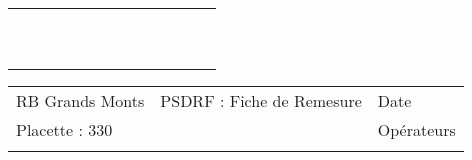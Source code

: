 \documentclass[a4paper, landscape]{article}\usepackage[]{graphicx}\usepackage[]{color}
\begin{document}
{\begin{tabular}{|p{1cm}|p{2cm}|p{1.6cm}|p{1.6cm}|p{1.6cm}|p{1.6cm}|p{1.5cm}|p{1.5cm}|p{1.5cm}|p{1.5cm}|p{1.5cm}|p{7.5cm}|p{5cm}|}
   \rowcolor[gray]{0.95} \hline
 &  &  &  &  &  &  &  &  &  &  &  &  \\ 
   \hline
 &  &  &  &  &  &  &  &  &  &  &  &  \\ 
   \rowcolor[gray]{0.95} \hline
 &  &  &  &  &  &  &  &  &  &  &  &  \\ 
   \hline
 &  &  &  &  &  &  &  &  &  &  &  &  \\ 
   \rowcolor[gray]{0.95} \hline
 &  &  &  &  &  &  &  &  &  &  &  &  \\ 
   \hline
 &  &  &  &  &  &  &  &  &  &  &  &  \\ 
   \rowcolor[gray]{0.95} \hline
 &  &  &  &  &  &  &  &  &  &  &  &  \\ 
   \hline
 &  &  &  &  &  &  &  &  &  &  &  &  \\ 
   \rowcolor[gray]{0.95} \hline
 &  &  &  &  &  &  &  &  &  &  &  &  \\ 
   \hline
 &  &  &  &  &  &  &  &  &  &  &  &  \\ 
   \rowcolor[gray]{0.95} \hline
 &  &  &  &  &  &  &  &  &  &  &  &  \\ 
   \hline
\end{tabular}
}

\begin{tabular}{p{10cm}p{10cm}p{8cm}}
  RB Grands Monts & PSDRF : Fiche de Remesure & Date \\ 
  Placette : 330 &  & Opérateurs \\ 
   &  &  \\ 
  \end{tabular}
\end{document}
